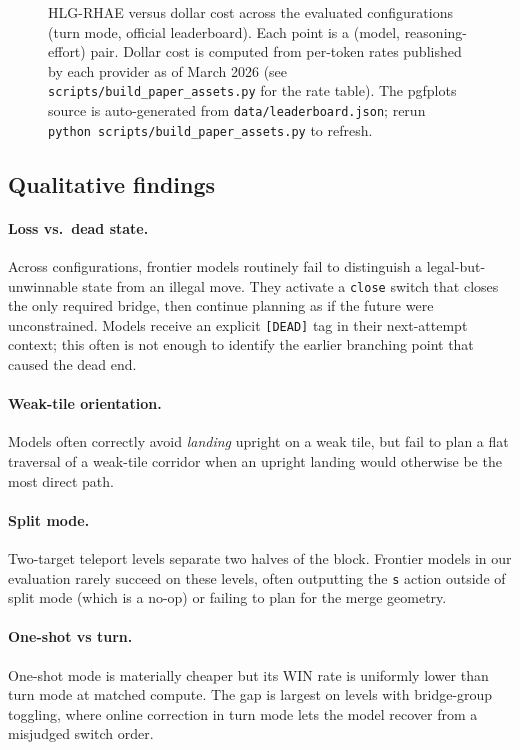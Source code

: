 \begin{figure}[t]
    \centering
    
    \caption{HLG-RHAE versus dollar cost across the evaluated configurations (turn
    mode, official leaderboard). Each point is a (model, reasoning-effort) pair.
    Dollar cost is computed from per-token rates published by each provider as of
    March 2026 (see \texttt{scripts/build\_paper\_assets.py} for the rate table). The
    pgfplots source is auto-generated from \texttt{data/leaderboard.json}; rerun
    \texttt{python scripts/build\_paper\_assets.py} to refresh.}
    \label{fig:perf}
\end{figure}

\subsection{Qualitative findings}

\paragraph{Loss vs.\ dead state.} Across configurations, frontier models routinely fail
to distinguish a legal-but-unwinnable state from an illegal move. They activate a
\texttt{close} switch that closes the only required bridge, then continue planning as
if the future were unconstrained. Models receive an explicit \texttt{[DEAD]} tag in
their next-attempt context; this often is not enough to identify the earlier branching
point that caused the dead end.

\paragraph{Weak-tile orientation.} Models often correctly avoid \emph{landing} upright
on a weak tile, but fail to plan a flat traversal of a weak-tile corridor when an
upright landing would otherwise be the most direct path.

\paragraph{Split mode.} Two-target teleport levels separate two halves of the block.
Frontier models in our evaluation rarely succeed on these levels, often outputting the
\texttt{s} action outside of split mode (which is a no-op) or failing to plan for the
merge geometry.

\paragraph{One-shot vs turn.} One-shot mode is materially cheaper but its WIN rate
is uniformly lower than turn mode at matched compute. The gap is largest on levels
with bridge-group toggling, where online correction in turn mode lets the model
recover from a misjudged switch order.

